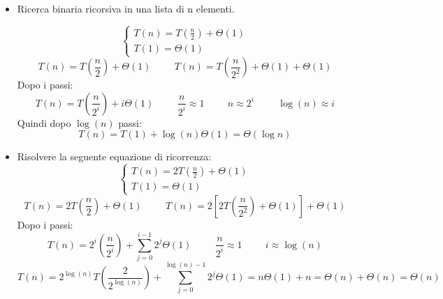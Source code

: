 \begin{example}
\begin{itemize}
        
        \item Ricerca binaria ricorsiva in una lista di n elementi.
        
        $$\begin{cases}T(n)=T(\frac{n}{2})+\Theta(1)\\ T(1)=\Theta(1)\end{cases}$$
        \begin{equation*}
            T(n)=T(\frac{n}{2})+\Theta(1)\hspace{1cm}T(n)=T(\frac{n}{2^2})+\Theta(1)+\Theta(1)
        \end{equation*}
        Dopo i passi:
        \begin{equation*}
            T(n)=T(\frac{n}{2^i})+i\Theta(1)\hspace{1cm}\frac{n}{2^i}\approx 1 \hspace{1cm} n\approx 2^i\hspace{1cm} \log(n)\approx i
        \end{equation*}
        Quindi dopo $\log(n)$ passi:
        \begin{equation*}
            T(n)=T(1)+\log(n)\Theta(1)=\Theta(\log n)
        \end{equation*}
        
        \item Risolvere la seguente equazione di ricorrenza:
        $$\begin{cases}T(n)=2T(\frac{n}{2})+\Theta(1)\\ T(1)=\Theta(1)\end{cases}$$
        \begin{equation*}
            T(n)=2T(\frac{n}{2})+\Theta(1)\hspace{1cm}T(n)=2[2T(\frac{n}{2^2})+\Theta(1)]+\Theta(1)
        \end{equation*}
        Dopo i passi:
        \begin{equation*}
            T(n)=2^i(\frac{n}{2^i})+\sum^{i-1}_{j=0}2^j\Theta(1)\hspace{1cm} \frac{n}{2^i}\approx1\hspace{1cm}i\approx \log(n)
        \end{equation*}
        \begin{equation*}
            T(n)=2^{\log(n)}T(\frac{2}{2^{\log(n)}})+\sum^{\log(n)-1}_{j=0}2^j\Theta(1)=n\Theta(1)+n=\Theta(n)+\Theta(n)=\Theta(n)
        \end{equation*}
        \end{itemize}
\end{example}

